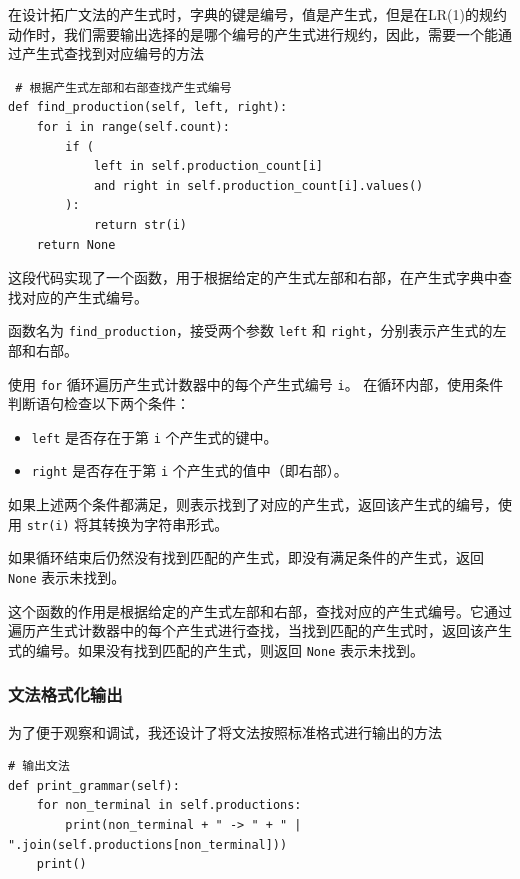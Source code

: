 \documentclass[lang=cn,11pt,a4paper]{elegantpaper}
\begin{document}
在设计拓广文法的产生式时，字典的键是编号，值是产生式，但是在LR(1)的规约动作时，我们需要输出选择的是哪个编号的产生式进行规约，因此，需要一个能通过产生式查找到对应编号的方法

\begin{lstlisting}
 # 根据产生式左部和右部查找产生式编号
def find_production(self, left, right):
    for i in range(self.count):
        if (
            left in self.production_count[i]
            and right in self.production_count[i].values()
        ):
            return str(i)
    return None
\end{lstlisting}

这段代码实现了一个函数，用于根据给定的产生式左部和右部，在产生式字典中查找对应的产生式编号。

函数名为 \lstinline{find_production}，接受两个参数 \lstinline{left} 和 \lstinline{right}，分别表示产生式的左部和右部。

使用 \lstinline{for} 循环遍历产生式计数器中的每个产生式编号 \lstinline{i}。
在循环内部，使用条件判断语句检查以下两个条件：
\begin{itemize}
    \item \lstinline{left} 是否存在于第 \lstinline{i} 个产生式的键中。
    \item \lstinline{right} 是否存在于第 \lstinline{i} 个产生式的值中（即右部）。
\end{itemize}

如果上述两个条件都满足，则表示找到了对应的产生式，返回该产生式的编号，使用 \lstinline{str(i)} 将其转换为字符串形式。

如果循环结束后仍然没有找到匹配的产生式，即没有满足条件的产生式，返回 \lstinline{None} 表示未找到。

这个函数的作用是根据给定的产生式左部和右部，查找对应的产生式编号。它通过遍历产生式计数器中的每个产生式进行查找，当找到匹配的产生式时，返回该产生式的编号。如果没有找到匹配的产生式，则返回 \lstinline{None} 表示未找到。

\subsubsection{文法格式化输出}

为了便于观察和调试，我还设计了将文法按照标准格式进行输出的方法

\begin{lstlisting}
# 输出文法
def print_grammar(self):
    for non_terminal in self.productions:
        print(non_terminal + " -> " + " | ".join(self.productions[non_terminal]))
    print()
\end{lstlisting}
\end{document}
